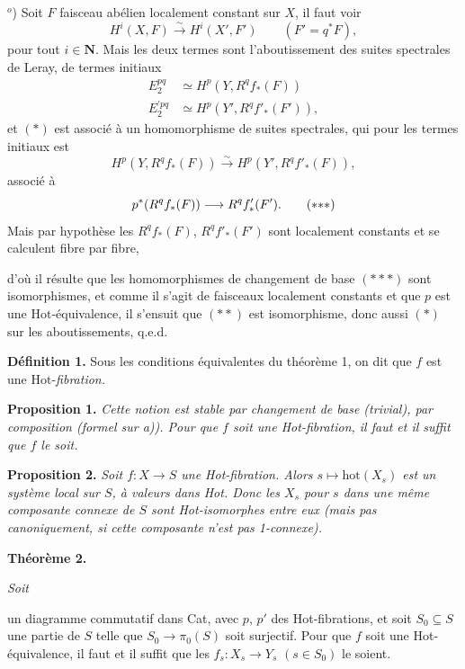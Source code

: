 \documentclass[11pt]{article}
\newcommand{\printedpage}[1]{\marginpar{\footnotesize p.~#1}}
\newcommand{\msp}[1]{\marginpar{\footnotesize [#1]}}
\newcommand{\Hot}{\mathrm{Hot}}
\begin{document}
$^o$) Soit $F$ faisceau abélien localement constant sur $X$, il faut voir
\[
H^i(X,F) \xrightarrow{\ \sim\ } H^i(X', F') \qquad (F' = q^*F), \tag*{$(*)$}
\]
pour tout $i \in \mathbf{N}$. Mais les deux termes sont l'aboutissement des suites spectrales de Leray, de termes initiaux
\[
\begin{aligned}
E_2^{pq} &\simeq H^p(Y, R^q f_*(F)) \\
E^{\prime pq}_2 &\simeq H^p(Y', R^q f'_*(F')),
\end{aligned}
\]
et $(*)$ est associé à un homomorphisme de suites spectrales, qui pour les termes initiaux est
\[
H^p(Y, R^q f_*(F)) \xrightarrow{\sim} H^p(Y', R^q f'_*(F)), \tag*{$(**)$} %
\]
associé à
\[
p^*(R^q f_*(F)) \longrightarrow R^q f'_*(F'). \tag*{$(*{*}*)$}
\]
Mais par hypothèse les $R^q f_*(F)$, $R^q f'_*(F')$ sont localement constants et se calculent fibre par fibre,

\msp{page 131}

\noindent d'où il résulte que les homomorphismes de changement de base $(*{*}*)$ sont isomorphismes, et comme il s'agit de faisceaux localement constants et que $p$ est une $\Hot$-équivalence, il s'ensuit que $(**)$ est isomorphisme, donc aussi $(*)$ sur les aboutissements, q.e.d.

\noindent\textbf{Définition 1.} Sous les conditions équivalentes du théorème 1, on dit que $f$ est une $\Hot$-\textit{fibration.}

\printedpage{4}

\textbf{Proposition 1.} \textit{Cette notion est stable par changement de base (trivial), par composition (formel sur a)). Pour que $f$ soit une \textup{Hot}-fibration, il faut et il suffit que $f$ le soit.}

\textbf{Proposition 2.} \textit{Soit $f : X \longrightarrow S$ une \textup{Hot}-fibration. Alors $s \longmapsto \mathrm{hot}(X_s)$ est un système local sur $S$, à valeurs dans \textup{Hot}. Donc les $X_s$ pour $s$ dans une même composante connexe de $S$ sont \textup{Hot}-isomorphes entre eux (mais pas canoniquement, si cette composante n'est pas \textup{1}-connexe).}

\textbf{Théorème 2.} {\itshape Soit
un diagramme commutatif dans \textup{Cat}, avec $p$, $p'$ des \textup{Hot}-fibrations, et soit $S_0 \subseteq S$ une partie de $S$ telle que $S_0 \longrightarrow \pi_0(S)$ soit surjectif. Pour que $f$ soit une \textup{Hot}-équivalence, il faut et il suffit que les $f_s : X_s \longrightarrow Y_s$ $(s \in S_0)$ le soient.} %
\end{document}
